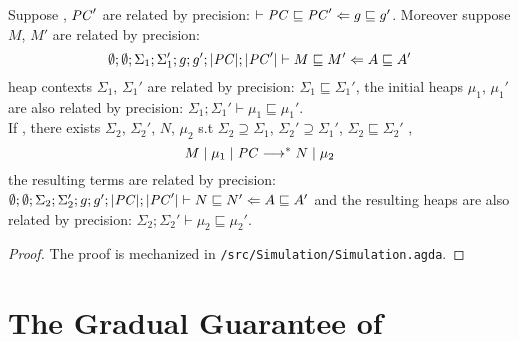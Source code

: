 \begin{lemma}
\label{lem:sim}
Suppose \PC, $\mathit{PC}'$ are related by precision: $\ccprec{\PC}{\PC'}{g}{g'}$.
Moreover suppose $M$, $M'$ are related by precision:
$${\emptyset};{\emptyset};{\Sigma_1};{\Sigma_1'};{g};{g'};{|\mathit{PC}|};{|\mathit{PC}'|}\vdash{M}\sqsubseteq{M'}\Leftarrow{A}\sqsubseteq{A'}$$
heap contexts $\Sigma_1$, $\Sigma_1'$ are related by precision:
$\Sigma_1 \sqsubseteq \Sigma_1'$, the initial heaps $\mu_1$, $\mu_1'$
are also related by precision: $\Sigma_1 ; \Sigma_1' \vdash \mu_1 \sqsubseteq \mu_1'$. \\
If , there exists $\Sigma_2$,
$\Sigma_2'$, $N$, $\mu_2$ s.t $\Sigma_2 \supseteq \Sigma_1$,
$\Sigma_2' \supseteq \Sigma_1'$, $\Sigma_2 \sqsubseteq \Sigma_2'$ ,
$$M\mid\mu_1\mid\mathit{PC} \longrightarrow^{*} N\mid\mu_2$$
the resulting terms are related by precision:
${\emptyset};{\emptyset};{\Sigma_2};{\Sigma_2'};{g};{g'};{|\mathit{PC}|};{|\mathit{PC}'|}\vdash{N}\sqsubseteq{N'}\Leftarrow{A}\sqsubseteq{A'}$
and the resulting heaps are also related by precision: $\Sigma_2 ; \Sigma_2' \vdash \mu_2 \sqsubseteq \mu_2'$.
\end{lemma}
\begin{proof}
  The proof is mechanized in \texttt{/src/Simulation/Simulation.agda}.
\end{proof}

\section{The Gradual Guarantee of \Surface}
\label{sec:gg}

